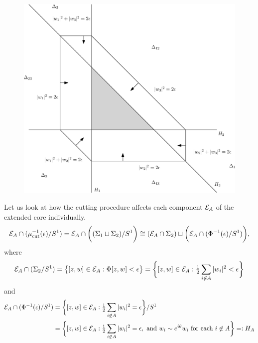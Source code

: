 \begin{figure}[h]
	\centering
	\includegraphics[width=12cm]{extended-core-cut.eps}\end{figure}

Let us look at how the cutting procedure affects each component $\mathcal{E}_{A}$ of the extended core individually.
\begin{equation*}
	\mathcal{E}_{A} \cap (\mu_{\text{cut}}^{-1}(\epsilon) / S^{1}) = 	\mathcal{E}_{A} \cap \bigg((\Sigma_{1} \sqcup \Sigma_{2})/S^{1}\bigg) \cong (\mathcal{E}_{A} \cap \Sigma_{2}) \sqcup \bigg( \mathcal{E}_{A} \cap  (\Phi^{-1}(\epsilon)/S^{1})\bigg),
\end{equation*}
where
\begin{equation*}
	\mathcal{E}_{A} \cap (\Sigma_{2}/S^{1}) = \big\{ [z,w] \in \mathcal{E}_{A} : \Phi[z,w] < \epsilon \big\} = \bigg\{ [z,w] \in \mathcal{E}_{A} : \tfrac{1}{2}\sum_{i \not\in A}|w_{i}|^{2} < \epsilon \bigg\}
\end{equation*}
and
\begin{equation*}
	\begin{split}
		\mathcal{E}_{A} \cap  (\Phi^{-1}(\epsilon)/S^{1}) &= \bigg\{ [z,w] \in \mathcal{E}_{A} : \tfrac{1}{2}\sum_{i \not\in A}|w_{i}|^{2} = \epsilon \bigg\}/S^{1} \\
		&= \bigg\{ [z,w] \in \mathcal{E}_{A} : \tfrac{1}{2}\sum_{i \not\in A}|w_{i}|^{2} = \epsilon,\text{ and } w_{i} \sim e^{i\theta}w_{i} \text{ for each } i \not\in A \bigg\} =: H_{A}
	\end{split}
\end{equation*}

